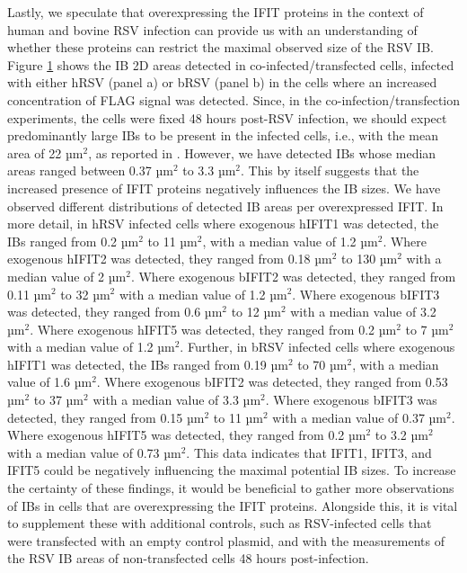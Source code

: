 \begin{figure}
    \label{fig:Distribution_IB_Areas_coInfected_Transfected_Cells_IFIT_RSV}
\end{figure}

Lastly, we speculate that overexpressing the IFIT proteins in the context of human and bovine RSV infection can provide us with an understanding of whether these proteins can restrict the maximal observed size of the RSV IB. Figure \ref{fig:Distribution_IB_Areas_coInfected_Transfected_Cells_IFIT_RSV} shows the IB 2D areas detected in co-infected/transfected cells, infected with either hRSV (panel a) or bRSV (panel b) in the cells where an increased concentration of FLAG signal was detected. Since, in the co-infection/transfection experiments, the cells were fixed 48 hours post-RSV infection, we should expect predominantly large IBs to be present in the infected cells, i.e., with the mean area of 22 \(\mbox{µm}^2\), as reported in \cite{Jobe2021BovineResponses}. However, we have detected IBs whose median areas ranged between 0.37 \(\mbox{µm}^2\) to 3.3 \(\mbox{µm}^2\). This by itself suggests that the increased presence of IFIT proteins negatively influences the IB sizes. We have observed different distributions of detected IB areas per overexpressed IFIT. In more detail, in hRSV infected cells where exogenous hIFIT1 was detected, the IBs ranged from 0.2 \(\mbox{µm}^2\) to 11 \(\mbox{µm}^2\), with a median value of 1.2 \(\mbox{µm}^2\). Where exogenous hIFIT2 was detected, they ranged from 0.18 \(\mbox{µm}^2\) to 130 \(\mbox{µm}^2\) with a median value of 2 \(\mbox{µm}^2\). Where exogenous bIFIT2 was detected, they ranged from 0.11 \(\mbox{µm}^2\) to 32 \(\mbox{µm}^2\) with a median value of 1.2 \(\mbox{µm}^2\). Where exogenous bIFIT3 was detected, they ranged from 0.6 \(\mbox{µm}^2\) to 12 \(\mbox{µm}^2\) with a median value of 3.2 \(\mbox{µm}^2\). Where exogenous hIFIT5 was detected, they ranged from 0.2 \(\mbox{µm}^2\) to 7 \(\mbox{µm}^2\) with a median value of 1.2 \(\mbox{µm}^2\). Further, in bRSV infected cells where exogenous hIFIT1 was detected, the IBs ranged from 0.19 \(\mbox{µm}^2\) to 70 \(\mbox{µm}^2\), with a median value of 1.6 \(\mbox{µm}^2\). Where exogenous bIFIT2 was detected, they ranged from 0.53 \(\mbox{µm}^2\) to 37 \(\mbox{µm}^2\) with a median value of 3.3 \(\mbox{µm}^2\). Where exogenous bIFIT3 was detected, they ranged from 0.15 \(\mbox{µm}^2\) to 11 \(\mbox{µm}^2\) with a median value of 0.37 \(\mbox{µm}^2\). Where exogenous hIFIT5 was detected, they ranged from 0.2 \(\mbox{µm}^2\) to 3.2 \(\mbox{µm}^2\) with a median value of 0.73 \(\mbox{µm}^2\). This data indicates that IFIT1, IFIT3, and IFIT5 could be negatively influencing the maximal potential IB sizes. To increase the certainty of these findings, it would be beneficial to gather more observations of IBs in cells that are overexpressing the IFIT proteins. Alongside this, it is vital to supplement these with additional controls, such as RSV-infected cells that were transfected with an empty control plasmid, and with the measurements of the RSV IB areas of non-transfected cells 48 hours post-infection.

